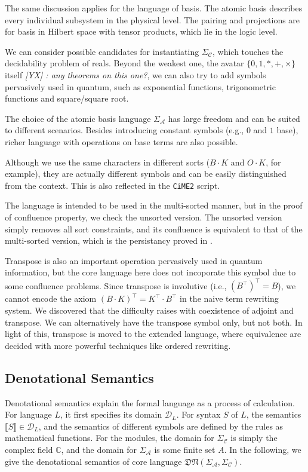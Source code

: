 \documentclass[manuscript, review, timestamp]{acmart}
\newcommand{\yx}[1]{\textit{\color{blue}[YX] : #1}}
\newcommand*{\sem}[1]{\llbracket #1 \rrbracket}
\begin{document}
The same discussion applies for the language of basis. The atomic basis describes every individual subsystem in the physical level. The pairing and projections are for basis in Hilbert space with tensor products, which lie in the logic level.

We can consider possible candidates for instantiating $\Sigma_\mathcal{C}$, which touches the decidability problem of reals. Beyond the weakest one, the avatar $\{0, 1, *, +, \times\}$ itself \yx{any theorems on this one?}, we can also try to add symbols pervasively used in quantum, such as exponential functions, trigonometric functions and square/square root.

The choice of the atomic basis language $\Sigma_\mathcal{A}$ has large freedom and can be suited to different scenarios. Besides introducing constant symbols (e.g., $0$ and $1$ base), richer language with operations on base terms are also possible. 


Although we use the same characters in different sorts ($B \cdot K$ and $O \cdot K$, for example), they are actually different symbols and can be easily distinguished from the context. This is also reflected in the \texttt{CiME2} script. 

The language is intended to be used in the multi-sorted manner, but in the proof of confluence property, we check the unsorted version. The unsorted version simply removes all sort constraints, and its confluence is equivalent to that of the multi-sorted version, which is the persistancy proved in \cite{Aoto1997}.


Transpose is also an important operation pervasively used in quantum information, but the core language here does not incoporate this symbol due to some confluence problems. Since transpose is involutive (i.e., $(B^\top)^\top = B$), we cannot encode the axiom $ (B \cdot K)^\top = K^\top \cdot B^\top$ in the naive term rewriting system. We discovered that the difficulty raises with coexistence of adjoint and transpose. We can alternatively have the transpose symbol only, but not both. In light of this, transpose is moved to the extended language, where equivalence are decided with more powerful techniques like ordered rewriting.

\subsection{Denotational Semantics}

Denotational semantics explain the formal language as a process of calculation. For language $L$, it first specifies its domain $\mathcal{D}_L$. For syntax $S$ of $L$, the semantics $\sem{S} \in \mathcal{D}_L$, and the semantics of different symbols are defined by the rules as mathematical functions. For the modules, the domain for $\Sigma_\mathcal{C}$ is simply the complex field $\mathbb{C}$, and the domain for $\Sigma_\mathcal{A}$ is some finite set $A$. In the following, we give the denotational semantics of core language $\mathfrak{DN}(\Sigma_\mathcal{A}, \Sigma_\mathcal{C})$. 
\end{document}
